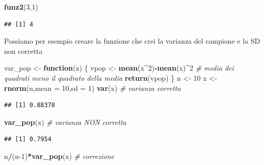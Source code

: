 \documentclass[
  11pt,
]{book}
\newenvironment{Shaded}{\begin{snugshade}}{\end{snugshade}}
\newcommand{\AttributeTok}[1]{\textcolor[rgb]{0.13,0.29,0.53}{#1}}
\newcommand{\CommentTok}[1]{\textcolor[rgb]{0.56,0.35,0.01}{\textit{#1}}}
\newcommand{\ControlFlowTok}[1]{\textcolor[rgb]{0.13,0.29,0.53}{\textbf{#1}}}
\newcommand{\DecValTok}[1]{\textcolor[rgb]{0.00,0.00,0.81}{#1}}
\newcommand{\FunctionTok}[1]{\textcolor[rgb]{0.13,0.29,0.53}{\textbf{#1}}}
\newcommand{\NormalTok}[1]{#1}
\newcommand{\OtherTok}[1]{\textcolor[rgb]{0.56,0.35,0.01}{#1}}
\newcommand{\SpecialCharTok}[1]{\textcolor[rgb]{0.81,0.36,0.00}{\textbf{#1}}}
\theoremstyle{mytheoremstyle}
\theoremstyle{mydefstyle}
\begin{document}
\begin{Shaded}
\begin{Highlighting}[]
\FunctionTok{funz2}\NormalTok{(}\DecValTok{3}\NormalTok{,}\DecValTok{1}\NormalTok{)}
\end{Highlighting}
\end{Shaded}

\begin{verbatim}
## [1] 4
\end{verbatim}

Possiamo per esempio creare la funzione che crei la varianza del campione e la SD non corretta

\begin{Shaded}
\begin{Highlighting}[]
\NormalTok{var\_pop }\OtherTok{\textless{}{-}} \ControlFlowTok{function}\NormalTok{(x) \{}
\NormalTok{  vpop }\OtherTok{\textless{}{-}} \FunctionTok{mean}\NormalTok{(x}\SpecialCharTok{\^{}}\DecValTok{2}\NormalTok{)}\SpecialCharTok{{-}}\FunctionTok{mean}\NormalTok{(x)}\SpecialCharTok{\^{}}\DecValTok{2} \CommentTok{\# media dei quadrati meno il quadrato della media}
  \FunctionTok{return}\NormalTok{(vpop)  }
\NormalTok{\}}
\NormalTok{n }\OtherTok{\textless{}{-}} \DecValTok{10}
\NormalTok{x }\OtherTok{\textless{}{-}} \FunctionTok{rnorm}\NormalTok{(n,}\AttributeTok{mean =} \DecValTok{10}\NormalTok{,}\AttributeTok{sd =} \DecValTok{1}\NormalTok{)}
\FunctionTok{var}\NormalTok{(x)     }\CommentTok{\# varianza corretta}
\end{Highlighting}
\end{Shaded}

\begin{verbatim}
## [1] 0.88378
\end{verbatim}

\begin{Shaded}
\begin{Highlighting}[]
\FunctionTok{var\_pop}\NormalTok{(x) }\CommentTok{\# varianza NON corretta}
\end{Highlighting}
\end{Shaded}

\begin{verbatim}
## [1] 0.7954
\end{verbatim}

\begin{Shaded}
\begin{Highlighting}[]
\NormalTok{n}\SpecialCharTok{/}\NormalTok{(n}\DecValTok{{-}1}\NormalTok{)}\SpecialCharTok{*}\FunctionTok{var\_pop}\NormalTok{(x) }\CommentTok{\# correzione}
\end{Highlighting}
\end{Shaded}
\end{document}

